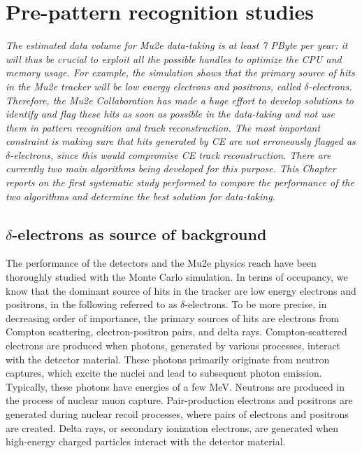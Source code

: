 \chapter{Pre-pattern recognition studies}\label{delta}
\textit{
The estimated data volume for Mu2e data-taking 
is at least 7 PByte per year: it will thus be crucial to 
exploit all the possible handles to optimize 
the CPU and memory usage. For example, the simulation 
shows that the primary source of hits in the 
Mu2e tracker will be low energy electrons and positrons, called $\delta$-electrons. 
Therefore, the Mu2e Collaboration has made 
a huge effort to develop solutions to identify 
and flag these hits as soon as possible in the 
data-taking and not use them in pattern 
recognition and track reconstruction. 
The most important constraint is 
making sure that hits generated by CE are 
not erroneously flagged as $\delta$-electrons, 
since this would compromise CE track reconstruction. 
There are currently two main algorithms being 
developed for this purpose. This Chapter reports 
on the first systematic study performed to compare 
the performance of the two algorithms and determine 
the best solution for data-taking. }



\section{$\delta$-electrons as source of background}

The performance of the detectors and the Mu2e 
physics reach have been thoroughly studied with 
the Monte Carlo simulation. In terms of 
occupancy, we know that the dominant 
source of hits in the tracker are low energy electrons and positrons,
in the following referred to as  
$\delta$-electrons. To be more precise, in 
decreasing order of importance, the primary sources of hits are 
electrons from Compton scattering, electron-positron pairs, 
and delta rays. Compton-scattered electrons are produced 
when photons, generated by various processes, 
interact with the detector material. These photons primarily 
originate from neutron captures, which excite the 
nuclei and lead  
to subsequent photon emission. Typically, 
these photons have 
energies of a few MeV. Neutrons are 
produced in the process of nuclear muon capture. Pair-production 
electrons and positrons are 
generated during nuclear recoil 
processes, where pairs of electrons 
and positrons are created.
Delta rays, 
or secondary ionization electrons, 
are generated when high-energy 
charged particles interact with the detector material.


